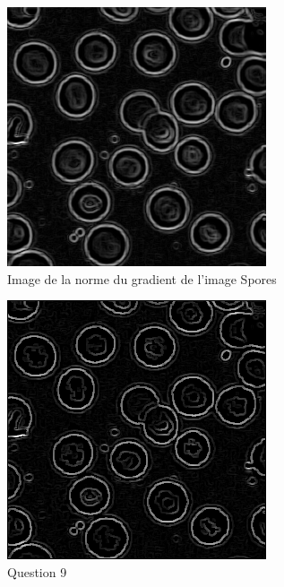 \documentclass[a4paper,12pt]{report}
\begin{document}
\newpage
\begin{figure}[!ht]
	\center	
	\includegraphics[scale=0.5]{image/gradient.png}
	\caption{Image de la norme du gradient de l'image Spores}
\end{figure}

\begin{figure}[!ht]
	\center	
	\includegraphics[scale=0.5]{image/q9.png}
	\caption{Question 9}
\end{figure}
\end{document}

